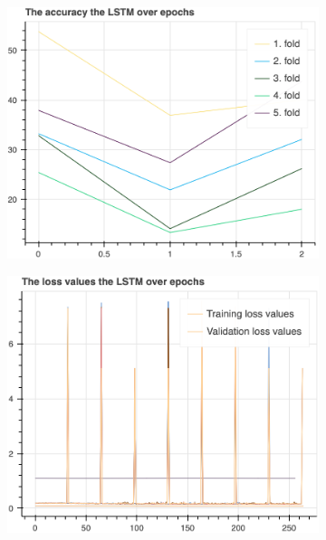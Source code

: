 		\begin{figure}[H]\ContinuedFloat
			\begin{subfigure}[b]{0.49\textwidth}
				\centering
				\includegraphics[width=\textwidth]{img/LSTM-accuracy.png}
			\end{subfigure}
			\hfill
			\begin{subfigure}[b]{0.49\textwidth}
				\centering
				\includegraphics[width=\textwidth]{img/LSTM-loss_values.png}
			\end{subfigure}
			\hfill
			\begin{subfigure}[b]{0.49\textwidth}

\end{subfigure}
\end{figure}
